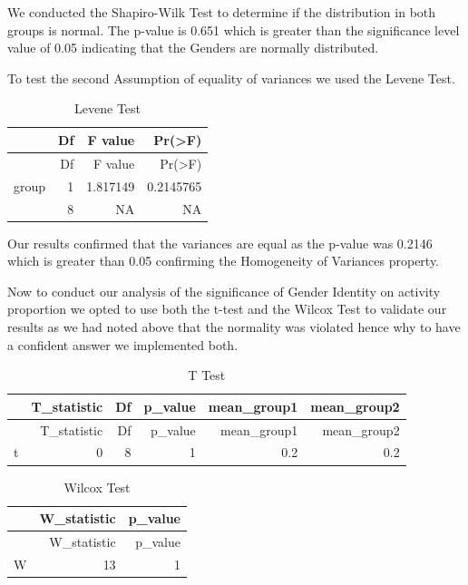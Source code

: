 \documentclass[
  letterpaper,
  DIV=11,
  numbers=noendperiod]{scrartcl}
\begin{document}
We conducted the Shapiro-Wilk Test to determine if the distribution in
both groups is normal. The p-value is 0.651 which is greater than the
significance level value of 0.05 indicating that the Genders are
normally distributed.

To test the second Assumption of equality of variances we used the
Levene Test.

\begin{longtable}[]{@{}lrrr@{}}
\caption{Levene Test}\tabularnewline
\toprule\noalign{}
& Df & F value & Pr(\textgreater F) \\
\midrule\noalign{}
\endfirsthead
\toprule\noalign{}
& Df & F value & Pr(\textgreater F) \\
\midrule\noalign{}
\endhead
\bottomrule\noalign{}
\endlastfoot
group & 1 & 1.817149 & 0.2145765 \\
& 8 & NA & NA \\
\end{longtable}

Our results confirmed that the variances are equal as the p-value was
0.2146 which is greater than 0.05 confirming the Homogeneity of
Variances property.

Now to conduct our analysis of the significance of Gender Identity on
activity proportion we opted to use both the t-test and the Wilcox Test
to validate our results as we had noted above that the normality was
violated hence why to have a confident answer we implemented both.

\begin{longtable}[]{@{}lrrrrr@{}}
\caption{T Test}\tabularnewline
\toprule\noalign{}
& T\_statistic & Df & p\_value & mean\_group1 & mean\_group2 \\
\midrule\noalign{}
\endfirsthead
\toprule\noalign{}
& T\_statistic & Df & p\_value & mean\_group1 & mean\_group2 \\
\midrule\noalign{}
\endhead
\bottomrule\noalign{}
\endlastfoot
t & 0 & 8 & 1 & 0.2 & 0.2 \\
\end{longtable}

\begin{longtable}[]{@{}lrr@{}}
\caption{Wilcox Test}\tabularnewline
\toprule\noalign{}
& W\_statistic & p\_value \\
\midrule\noalign{}
\endfirsthead
\toprule\noalign{}
& W\_statistic & p\_value \\
\midrule\noalign{}
\endhead
\bottomrule\noalign{}
\endlastfoot
W & 13 & 1 \\
\end{longtable}
\end{document}
